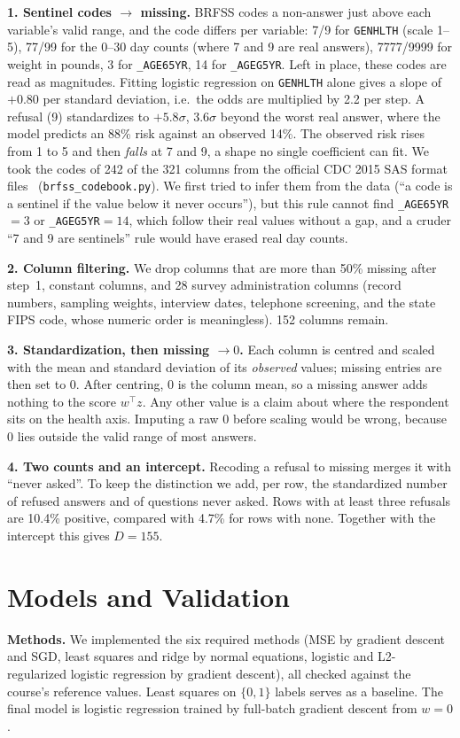 \documentclass[10pt,conference]{IEEEtran}
\begin{document}
\textbf{1. Sentinel codes $\to$ missing.} BRFSS codes a non-answer just above each
variable's valid range, and the code differs per variable: 7/9 for
\texttt{GENHLTH} (scale 1--5), 77/99 for the 0--30 day counts (where 7 and 9 are
real answers), 7777/9999 for weight in pounds, 3 for \texttt{\_AGE65YR}, 14 for
\texttt{\_AGEG5YR}. Left in place, these codes are read as magnitudes.
Fitting logistic regression on \texttt{GENHLTH} alone gives a slope of $+0.80$
per standard deviation, i.e.\ the odds are multiplied by 2.2 per step. A
refusal (9) standardizes to $+5.8\sigma$, 3.6$\sigma$ beyond the worst real
answer, where the model predicts an 88\% risk against an observed 14\%. The
observed risk rises from 1 to 5 and then \emph{falls} at 7 and 9, a shape no
single coefficient can fit. We took the codes of 242 of the 321 columns from the
official CDC 2015 SAS format files~\cite{brfss} (\texttt{brfss\_codebook.py}).
We first tried to infer them from the data (``a code is a sentinel if the value
below it never occurs''), but this rule cannot find \texttt{\_AGE65YR}$=3$ or
\texttt{\_AGEG5YR}$=14$, which follow their real values without a gap, and a
cruder ``7 and 9 are sentinels'' rule would have erased real day counts.

\textbf{2. Column filtering.} We drop columns that are more than 50\% missing
after step~1, constant columns, and 28 survey administration columns (record
numbers, sampling weights, interview dates, telephone screening, and the state
FIPS code, whose numeric order is meaningless). 152 columns remain.

\textbf{3. Standardization, then missing $\to 0$.} Each column is centred and
scaled with the mean and standard deviation of its \emph{observed} values;
missing entries are then set to 0. After centring, 0 is the column mean, so a
missing answer adds nothing to the score $w^\top z$. Any other value is a claim
about where the respondent sits on the health axis. Imputing a raw 0 before
scaling would be wrong, because 0 lies outside the valid range of most answers.

\textbf{4. Two counts and an intercept.} Recoding a refusal to missing merges
it with ``never asked''. To keep the distinction we add, per row, the
standardized number of refused answers and of questions never asked. Rows
with at least three refusals are 10.4\% positive, compared with 4.7\% for rows
with none. Together with the intercept this gives $D=155$.

\section{Models and Validation}
\textbf{Methods.} We implemented the six required methods (MSE by gradient
descent and SGD, least squares and ridge by normal equations, logistic and
L2-regularized logistic regression by gradient descent), all checked against
the course's reference values. Least squares on $\{0,1\}$ labels serves as
a baseline. The final model is logistic regression trained by full-batch
gradient descent from $w=0$.
\end{document}
